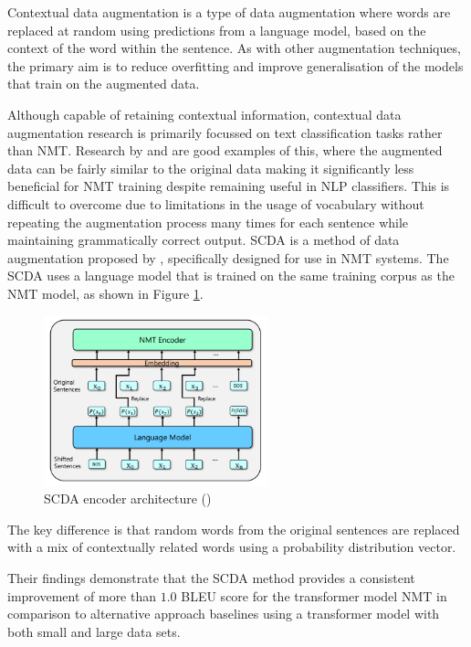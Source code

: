 Contextual data augmentation is a type of data augmentation where words are replaced at random using predictions from a language model, based on the context of the word within the sentence. As with other augmentation techniques, the primary aim is to reduce overfitting and improve generalisation of the models that train on the augmented data. 

Although capable of retaining contextual information, contextual data augmentation research is primarily focussed on text classification tasks rather than \acrshort{NMT}. Research by \cite{wu_conditional_2018} and \cite{kobayashi_contextual_2018} are good examples of this, where the augmented data can be fairly similar to the original data making it significantly less beneficial for \acrshort{NMT} training despite remaining useful in \acrshort{NLP} classifiers. This is difficult to overcome due to limitations in the usage of vocabulary without repeating the augmentation process many times for each sentence while maintaining grammatically correct output.
\acrfull{SCDA} is a method of data augmentation proposed by \cite{zhu_soft_2019}, specifically designed for use in \acrshort{NMT} systems. The \acrshort{SCDA} uses a language model that is trained on the same training corpus as the \acrshort{NMT} model, as shown in Figure \ref{fig:scda}.

\begin{figure}[ht!]
\centering
\includegraphics[width=0.58\textwidth]{media/literature/data_argumentation/da_scda.png}
\caption[\acrlong{SCDA} encoder architecture]{\acrlong{SCDA} encoder architecture (\cite{zhu_soft_2019})}
\label{fig:scda}
\end{figure}

The key difference is that random words from the original sentences are replaced with a mix of contextually related words using a probability distribution vector.




Their findings demonstrate that the \acrshort{SCDA} method provides a consistent improvement of more than $1.0$ BLEU score for the transformer model \acrshort{NMT} in comparison to alternative approach baselines using a transformer model with both small and large data sets.


